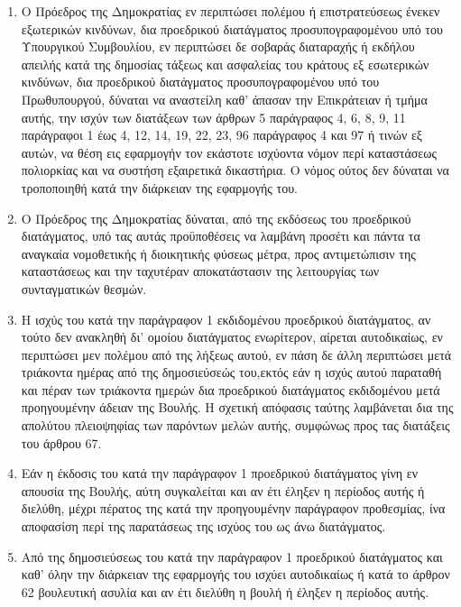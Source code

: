 \documentclass[twoside, a4paper, 10pt]{article}
\begin{document}
\begin{multicols}{2}
\begin{enumerate}
\begin{BigQuote}
\begin{enumerate}
  \item[1.] Ο Πρόεδρος της Δημοκρατίας εν περιπτώσει πολέμου ή επιστρατεύσεως ένεκεν εξωτερικών κινδύνων, δια προεδρικού διατάγματος προσυπογραφομένου υπό του Υπουργικού Συμβουλίου, εν περιπτώσει δε σοβαράς διαταραχής ή εκδήλου απειλής κατά της δημοσίας τάξεως και ασφαλείας του κράτους εξ εσωτερικών κινδύνων, δια προεδρικού διατάγματος προσυπογραφομένου υπό του Πρωθυπουργού, δύναται να αναστείλη  καθ' άπασαν την Επικράτειαν ή τμήμα αυτής, την ισχύν των διατάξεων των άρθρων 5 παράγραφος 4, 6, 8, 9, 11 παράγραφοι 1 έως 4, 12, 14, 19, 22, 23, 96 παράγραφος 4 και 97 ή τινών εξ αυτών, να θέση εις εφαρμογήν τον εκάστοτε ισχύοντα νόμον περί καταστάσεως πολιορκίας και να συστήση εξαιρετικά δικαστήρια. Ο νόμος ούτος δεν δύναται να τροποποιηθή κατά την διάρκειαν  της εφαρμογής του.
  \item[2.] Ο Πρόεδρος της Δημοκρατίας δύναται, από της εκδόσεως του προεδρικού διατάγματος, υπό τας αυτάς προϋποθέσεις να λαμβάνη προσέτι  και πάντα τα αναγκαία νομοθετικής ή διοικητικής φύσεως μέτρα, προς αντιμετώπισιν της καταστάσεως και την ταχυτέραν αποκατάστασιν της λειτουργίας των συνταγματικών θεσμών.
  \item[3.] Η ισχύς του κατά την παράγραφον 1 εκδιδομένου προεδρικού διατάγματος, αν τούτο δεν ανακληθή δι' ομοίου διατάγματος ενωρίτερον, αίρεται αυτοδικαίως, εν περιπτώσει μεν πολέμου από της λήξεως αυτού, εν πάση δε άλλη περιπτώσει μετά τριάκοντα ημέρας από της δημοσιεύσεώς του,εκτός εάν η ισχύς αυτού παραταθή και πέραν των τριάκοντα ημερών δια προεδρικού διατάγματος εκδιδομένου μετά προηγουμένην άδειαν της Βουλής. Η σχετική απόφασις ταύτης λαμβάνεται δια της απολύτου πλειοψηφίας των παρόντων μελών αυτής, συμφώνως προς τας διατάξεις του άρθρου 67.
  \item[4.] Εάν η έκδοσις του κατά την παράγραφον 1 προεδρικού διατάγματος γίνη εν απουσία της Βουλής, αύτη συγκαλείται και αν έτι έληξεν η περίοδος αυτής ή διελύθη, μέχρι πέρατος της κατά την προηγουμένην παράγραφον προθεσμίας, ίνα αποφασίση περί της παρατάσεως της ισχύος του ως άνω διατάγματος.
  \item[5.] Από της δημοσιεύσεως του κατά την παράγραφον 1 προεδρικού διατάγματος και καθ' όλην την διάρκειαν της εφαρμογής του ισχύει αυτοδικαίως ή κατά το άρθρον 62 βουλευτική ασυλία και αν έτι διελύθη η βουλή ή έληξεν η περίοδος αυτής.
\end{enumerate}


\end{BigQuote}
\end{enumerate}
\end{multicols}
\end{document}
